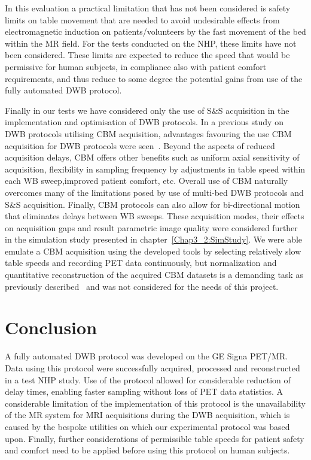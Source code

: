 In this evaluation a practical limitation that has not been considered is safety limits on table movement that are needed to avoid undesirable effects from electromagnetic induction on patients/volunteers by the fast movement of the bed within the MR field. For the tests conducted on the NHP, these limits have not been considered. These limits are expected to reduce the speed that would be permissive for human subjects, in compliance also with patient comfort requirements, and thus reduce to some degree the potential gains from use of the fully automated DWB protocol. 

Finally in our tests we have considered only the use of S\&S acquisition in the implementation and optimisation of DWB protocols. 
In a previous study on DWB protocols utilising CBM acquisition, advantages favouring the use CBM acquisition for DWB protocols were seen~\cite{Karakatsanis2016a}. Beyond the aspects of reduced acquisition delays, CBM offers other benefits such as uniform axial sensitivity of acquisition, flexibility in sampling frequency by adjustments in table speed within each WB sweep,improved patient comfort, etc. 
Overall use of CBM naturally overcomes many of the limitations posed by use of multi-bed DWB protocols and S\&S acquisition. 
Finally, CBM protocols can also allow for bi-directional motion that eliminates delays between WB sweeps. 
These acquisition modes, their effects on acquisition gaps and result parametric image quality were considered further in the simulation study presented in chapter~\ref{Chap3_2:SimStudy}.
We were able emulate a CBM acquisition using the developed tools by selecting relatively slow table speeds and recording PET data continuously, but normalization and quantitative reconstruction of the acquired CBM datasets is a demanding task as previously described~\cite{Panin2014} and was not considered for the needs of this project.

\section{Conclusion}
A fully automated DWB protocol was developed on the GE Signa PET/MR. Data using this protocol were successfully acquired, processed and reconstructed in a test NHP study.
Use of the protocol allowed for considerable reduction of delay times, enabling faster sampling without loss of PET data statistics.
A considerable limitation of the implementation of this protocol is the unavailability of the MR system for MRI acquisitions during the DWB acquisition, which is caused by the bespoke utilities on which our experimental protocol was based upon.
Finally, further considerations of permissible table speeds for patient safety and comfort need to be applied before using this protocol on human subjects.

